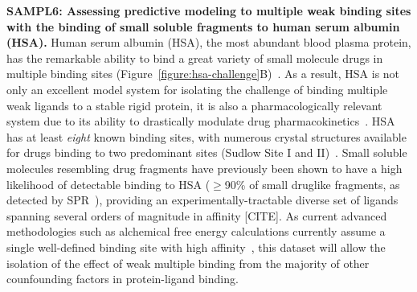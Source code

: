 \documentclass[11pt]{article}
\begin{document}
{\bf SAMPL6: Assessing predictive modeling to multiple weak binding sites with the binding of small soluble fragments to human serum albumin (HSA).}
Human serum albumin (HSA), the most abundant blood plasma protein, has the remarkable ability to bind a great variety of small molecule drugs in multiple binding sites (Figure~\ref{figure:hsa-challenge}B)~\cite{Fasano:2005:IUBMBLife(InternationalUnionofBiochemistryandMolecularBiology:Life)a}.
As a result, HSA is not only an excellent model system for isolating the challenge of binding multiple weak ligands to a stable rigid protein, it is also a pharmacologically relevant system due to its ability to drastically modulate drug pharmacokinetics~\cite{Hall:2013:JournalofChemicalInformationandModelinga}.
HSA has at least \emph{eight} known binding sites, with numerous crystal structures available for drugs binding to two predominant sites (Sudlow Site I and II)~\cite{Hall:2013:JournalofChemicalInformationandModelinga}.
Small soluble molecules resembling drug fragments have previously been shown to have a high likelihood of detectable binding to HSA ($\ge$90\% of small druglike fragments, as detected by SPR~\cite{Elinder:2011:JournalofBiomolecularScreening}), providing an experimentally-tractable diverse set of ligands spanning several orders of magnitude in affinity [CITE].
As current advanced methodologies such as alchemical free energy calculations currently assume a single well-defined binding site with high affinity~\cite{Gilson:1997:BiophysicalJournal}, this dataset will allow the isolation of the effect of weak multiple binding from the majority of other counfounding factors in protein-ligand binding.
\end{document}
